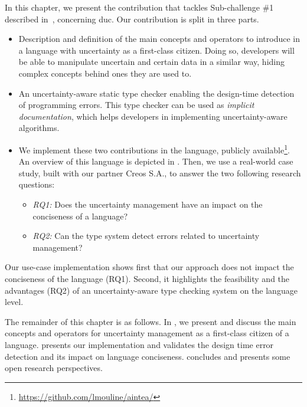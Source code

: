 In this chapter, we present the contribution that tackles Sub-challenge \#1 described in~, concerning \gls{duc}.
Our contribution is split in three parts.
\begin{itemize}
	\setlength\itemsep{-0.3em}
    \item Description and definition of the main concepts and operators to introduce in a language with uncertainty as a first-class citizen. Doing so, developers will be able to manipulate uncertain and certain data in a similar way, hiding complex concepts behind ones they are used to. 
    \item An uncertainty-aware static type checker enabling the design-time detection of programming errors. This type checker can be used as \textit{implicit documentation}, which helps developers in implementing uncertainty-aware algorithms.
    \item We implement these two contributions in the \langName{} language, publicly available\footnote{\url{https://github.com/lmouline/aintea/}}. An overview of this language is depicted in . Then, we use a real-world case study, built with our partner Creos S.A., to answer the two following research questions: 
    \begin{itemize}
		\setlength\itemsep{-0.3em}
    	\item \textit{RQ1:} Does the uncertainty management have an impact on the conciseness of a language? 
		\item \textit{RQ2:} Can the type system detect errors related to uncertainty management?
    \end{itemize}
\end{itemize}

Our use-case implementation shows first that our approach does not impact the conciseness of the language (RQ1).
Second, it highlights the feasibility and the advantages (RQ2) of an uncertainty-aware type checking system on the language level.

The remainder of this chapter is as follows.
In , we present and discuss the main concepts and operators for uncertainty management as a first-class citizen of a language. 
 presents our \langName{} implementation and validates the design time error detection and its impact on language conciseness. 
 concludes and presents some open research perspectives. 

\vfill